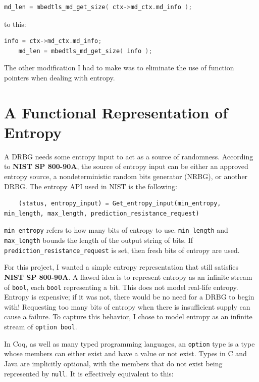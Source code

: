 \documentclass[pageno]{jpaper}
\newcommand{\stdtitle}[1]{\textbf{#1}}
\begin{document}
\begin{lstlisting}[language=C]
    md_len = mbedtls_md_get_size( ctx->md_ctx.md_info );
\end{lstlisting}

\noindent to this:

\begin{lstlisting}[language=C]
    info = ctx->md_ctx.md_info;
    md_len = mbedtls_md_get_size( info );
\end{lstlisting}

The other modification I had to make was to eliminate the use of function pointers when dealing with entropy.

\section{A Functional Representation of Entropy} \label{entropy}
A DRBG needs some entropy input to act as a source of randomness. According to \stdtitle{NIST SP 800-90A}, the source of entropy input can be either an approved entropy source, a nondeterministic random bits generator (NRBG), or another DRBG. The entropy API used in NIST is the following:

\begin{lstlisting}
    (status, entropy_input) = Get_entropy_input(min_entropy, min_length, max_length, prediction_resistance_request)
\end{lstlisting}

\lstinline{min_entropy} refers to how many bits of entropy to use. \lstinline{min_length} and \lstinline{max_length} bounds the length of the output string of bits. If \lstinline{prediction_resistance_request} is set, then fresh bits of entropy are used.

For this project, I wanted a simple entropy representation that still satisfies \stdtitle{NIST SP 800-90A}. A flawed idea is to represent entropy as an infinite stream of \lstinline{bool}, each \lstinline{bool} representing a bit. This does not model real-life entropy. Entropy is expensive; if it was not, there would be no need for a DRBG to begin with! Requesting too many bits of entropy when there is insufficient supply can cause a failure. To capture this behavior, I chose to model entropy as an infinite stream of \lstinline{option bool}.

In Coq, as well as many typed programming languages, an \lstinline{option} type is a type whose members can either exist and have a value or not exist. Types in C and Java are implicitly optional, with the members that do not exist being represented by \lstinline{null}. It is effectively equivalent to this:
\end{document}
